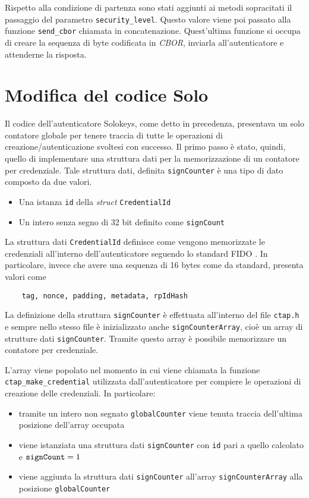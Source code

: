 Rispetto alla condizione di partenza sono stati aggiunti ai metodi sopracitati il passaggio del parametro \verb*|security_level|. Questo valore viene poi passato alla funzione \verb*|send_cbor| chiamata in concatenazione. Quest'ultima funzione si occupa di creare la sequenza di byte codificata in \emph{CBOR}, inviarla all'autenticatore e attenderne la risposta. 

\section{Modifica del codice Solo}
\label{modifica_solo}

Il codice dell'autenticatore Solokeys, come detto in precedenza, presentava un solo contatore globale per tenere traccia di tutte le operazioni di creazione/autenticazione svoltesi con successo. Il primo passo è stato, quindi, quello di implementare una struttura dati per la memorizzazione di un contatore per credenziale. Tale struttura dati, definita \verb*|signCounter| è una tipo di dato composto da due valori.
\begin{itemize}
	\item Una istanza \verb*|id| della \emph{struct} \verb*|CredentialId|
	\item Un intero senza segno di 32 bit definito come \verb*|signCount|
\end{itemize}

La struttura dati \verb*|CredentialId| definisce come vengono memorizzate le credenziali all'interno dell'autenticatore seguendo lo standard FIDO \cite{fido:credential_id}. In particolare, invece che avere una sequenza di 16 bytes come da standard, presenta valori come \begin{verbatim}
	tag, nonce, padding, metadata, rpIdHash
\end{verbatim} 

La definizione della struttura \verb*|signCounter| è effettuata all'interno del file \verb*|ctap.h| e sempre nello stesso file è inizializzato anche \verb*|signCounterArray|, cioè un array di strutture dati \verb*|signCounter|. Tramite questo array è possibile memorizzare un contatore per credenziale. 

L'array viene popolato nel momento in cui viene chiamata la funzione \verb*|ctap_make_credential| utilizzata dall'autenticatore per compiere le operazioni di creazione delle credenziali. In particolare:
\begin{itemize}
	\item tramite un intero non segnato \verb*|globalCounter| viene tenuta traccia dell'ultima posizione dell'array occupata
	\item viene istanziata una struttura dati \verb*|signCounter| con \verb*|id| pari a quello calcolato e $\verb*|signCount| = 1 $
	\item viene aggiunta la struttura dati \verb*|signCounter| all'array \verb*|signCounterArray| alla posizione \verb*|globalCounter|
\end{itemize}

